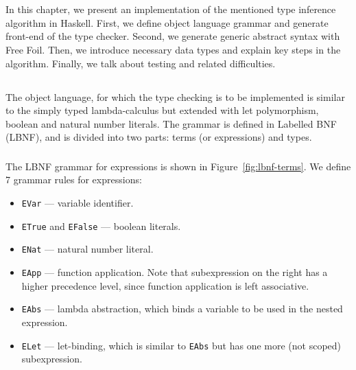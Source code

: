 \chapter{}
\label{chap:implementation}

In this chapter, we present an implementation of the mentioned type inference algorithm in Haskell. First, we define object language grammar and generate front-end of the type checker. Second, we generate generic abstract syntax with Free Foil. Then, we introduce necessary data types and explain key steps in the algorithm. Finally, we talk about testing and related difficulties.

\section{}

The object language, for which the type checking is to be implemented is similar to the simply typed lambda-calculus but extended with let polymorphism, boolean and natural number literals. The grammar is defined in Labelled BNF (LBNF), and is divided into two parts: terms (or expressions) and types.


\subsection{}

The LBNF grammar for expressions is shown in Figure~\ref{fig:lbnf-terms}. We define 7 grammar rules for expressions:

\begin{itemize}
  \item \texttt{EVar} — variable identifier.
  \item \texttt{ETrue} and \texttt{EFalse} — boolean literals.
  \item \texttt{ENat} — natural number literal.
  \item \texttt{EApp} — function application. Note that subexpression on the right has a higher precedence level, since function application is left associative.
  \item \texttt{EAbs} — lambda abstraction, which binds a variable to be used in the nested expression.
  \item \texttt{ELet} — let-binding, which is similar to \texttt{EAbs} but has one more (not scoped) subexpression.
\end{itemize}

